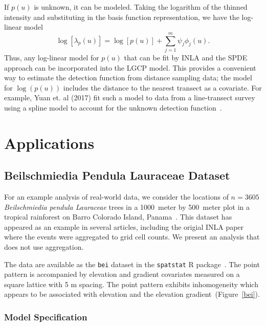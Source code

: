 \documentclass[]{interact}
\begin{document}
If \(p(u)\) is unknown, it can be modeled. Taking the logarithm of
the thinned intensity and substituting in the basis function representation,
we have the log-linear model
\begin{displaymath}
\log\left[\lambda_{p}(u)\right]
= \log\left[p(u)\right] + \sum_{j = 1}^{m} \psi_{j} \phi_{j}(u).
\end{displaymath}
Thus, any log-linear model for \(p(u)\) that can be fit by INLA and the SPDE
approach can be incorporated into the LGCP model. This provides a convenient
way to estimate the detection function from distance sampling data; the model
for \(\log(p(u))\) includes the distance to the nearest transect as a
covariate. For example, Yuan et. al (2017) fit such a model to data from a
line-transect survey using a spline model to account for the unknown detection
function~\cite{yuanetal}.


\section{Applications}
\label{application}


\subsection{Beilschmiedia Pendula Lauraceae Dataset}
\label{beianalysis}

For an example analysis of real-world data, we consider the locations of
\(n = 3605\) \emph{Beilschmiedia pendula Lauraceae} trees in a 1000~meter by
500~meter plot in a tropical rainforest on Barro Colorado Island,
Panama~\cite{moellerwaagepetersen}. This dataset has appeared as an example
in several articles, including the origial INLA paper where the events were
aggregated to grid cell counts. We present an analysis that does not use
aggregation.

The data are available as the \texttt{bei} dataset in the \texttt{spatstat} R
package~\cite{spatstat}. The point pattern is accompanied by elevation and
gradient covariates measured on a square lattice with 5 m spacing. The point
pattern exhibits inhomogeneity which appears to be associated with elevation
and the elevation gradient~(Figure~\ref{bei}).


\subsubsection{Model Specification}
\end{document}
